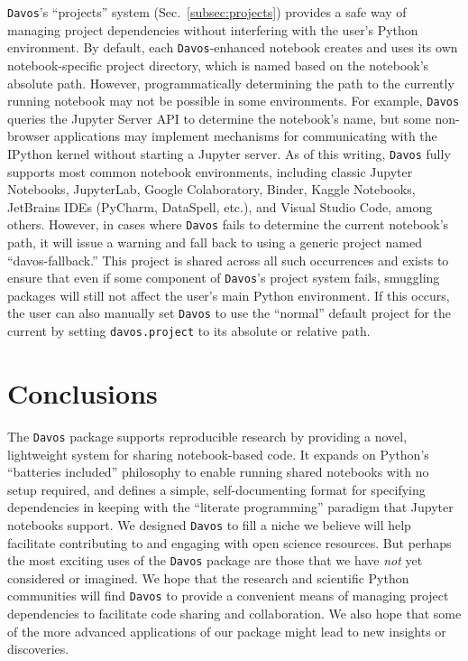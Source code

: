 \documentclass[preprint,12pt,a4paper]{elsarticle}
\begin{document}
\texttt{Davos}'s ``projects'' system (Sec.~\ref{subsec:projects}) provides a safe way
of managing project dependencies without interfering with the user's Python
environment. By default, each \texttt{Davos}-enhanced notebook creates and uses its own
notebook-specific project directory, which is named based on the notebook's absolute
path. However, programmatically determining the path to the currently running
notebook may not be possible in some environments.
For example, \texttt{Davos} queries the Jupyter Server API to determine the notebook's name, but some non-browser applications may implement mechanisms for communicating with the IPython kernel without starting a Jupyter server.
As of this writing, \texttt{Davos} fully supports most common notebook environments, including classic Jupyter Notebooks,
JupyterLab, Google Colaboratory, Binder, Kaggle Notebooks, JetBrains IDEs (PyCharm, DataSpell, etc.), and Visual Studio Code, among others.
However, in cases where \texttt{Davos} fails to determine the current notebook's path, it will issue a warning and fall back to using a generic project named ``davos-fallback.'' This project is shared across all such occurrences and exists to ensure that even if some component of \texttt{Davos}'s project system fails, smuggling packages will still not affect the user's main Python environment. If this occurs, the user can also manually set \texttt{Davos} to use the ``normal'' default project for the current by setting \texttt{davos.project} to its absolute or relative path.


\section{Conclusions}

The \texttt{Davos} package supports reproducible research by providing
a novel, lightweight system for sharing notebook-based code. It
expands on Python's ``batteries included'' philosophy to enable running shared
notebooks with no setup required, and defines a simple, self-documenting format for
specifying dependencies in keeping with the ``literate programming'' paradigm that Jupyter notebooks support.
We designed \texttt{Davos} to fill a niche we believe will help facilitate contributing to and engaging with open science resources.
But perhaps the most exciting uses of the \texttt{Davos} package are those
that we have \textit{not} yet considered or imagined. We hope that the
research and scientific Python communities will find \texttt{Davos} to provide a convenient
means of managing project dependencies to facilitate code sharing and collaboration. We
also hope that some of the more advanced applications of our package
might lead to new insights or discoveries.
\end{document}
